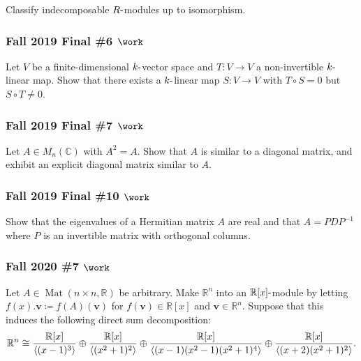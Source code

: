 Classify indecomposable \(R{\hbox{-}}\)modules up to isomorphism.

\hypertarget{fall-2019-final-6-work}{%
\subsubsection{\texorpdfstring{Fall 2019 Final \#6
\(\work\)}{Fall 2019 Final \#6 \textbackslash work}}\label{fall-2019-final-6-work}}

Let \(V\) be a finite-dimensional \(k{\hbox{-}}\)vector space and
\(T:V\to V\) a non-invertible \(k{\hbox{-}}\)linear map. Show that there
exists a \(k{\hbox{-}}\)linear map \(S:V\to V\) with \(T\circ S = 0\)
but \(S\circ T\neq 0\).

\hypertarget{fall-2019-final-7-work}{%
\subsubsection{\texorpdfstring{Fall 2019 Final \#7
\(\work\)}{Fall 2019 Final \#7 \textbackslash work}}\label{fall-2019-final-7-work}}

Let \(A\in M_n({\mathbb{C}})\) with \(A^2 = A\). Show that \(A\) is
similar to a diagonal matrix, and exhibit an explicit diagonal matrix
similar to \(A\).

\hypertarget{fall-2019-final-10-work}{%
\subsubsection{\texorpdfstring{Fall 2019 Final \#10
\(\work\)}{Fall 2019 Final \#10 \textbackslash work}}\label{fall-2019-final-10-work}}

Show that the eigenvalues of a Hermitian matrix \(A\) are real and that
\(A = PDP^{-1}\) where \(P\) is an invertible matrix with orthogonal
columns.

\hypertarget{fall-2020-7-work}{%
\subsubsection{\texorpdfstring{Fall 2020 \#7
\(\work\)}{Fall 2020 \#7 \textbackslash work}}\label{fall-2020-7-work}}

Let \(A \in \operatorname{Mat}(n\times n, {\mathbb{R}})\) be arbitrary.
Make \({\mathbb{R}}^n\) into an \({\mathbb{R}}[x]{\hbox{-}}\)module by
letting \(f(x).\mathbf{v} \coloneqq f(A)(\mathbf{v})\) for
\(f(\mathbf{v})\in {\mathbb{R}}[x]\) and
\(\mathbf{v} \in {\mathbb{R}}^n\). Suppose that this induces the
following direct sum decomposition:
\begin{align*}
{\mathbb{R}}^n \cong
{ {\mathbb{R}}[x] \over \left\langle{ (x-1)^3 }\right\rangle }
\oplus
{ {\mathbb{R}}[x] \over \left\langle{ (x^2+1)^2 }\right\rangle }
\oplus
{ {\mathbb{R}}[x] \over \left\langle{ (x-1)(x^2-1)(x^2+1)^4 }\right\rangle }
\oplus
{ {\mathbb{R}}[x] \over \left\langle{ (x+2)(x^2+1)^2 }\right\rangle }
.\end{align*}


